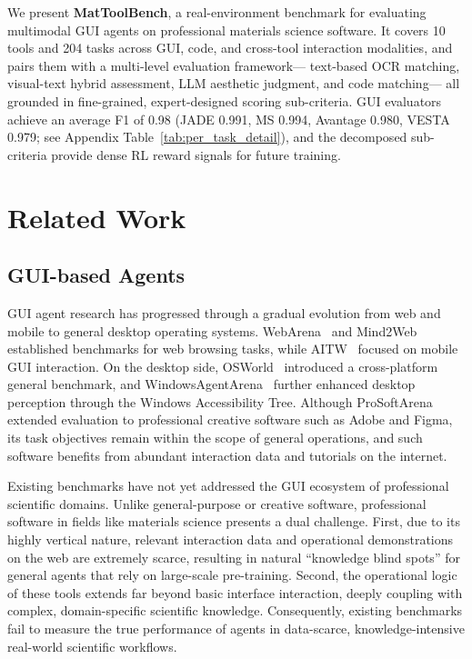 \documentclass{article}
\begin{document}
We present \textbf{MatToolBench}, a real-environment benchmark for evaluating multimodal
GUI agents on professional materials science software.
It covers 10 tools and 204 tasks across GUI, code, and cross-tool interaction modalities,
and pairs them with a multi-level evaluation framework—
text-based OCR matching, visual-text hybrid assessment, LLM aesthetic judgment, and code matching—
all grounded in fine-grained, expert-designed scoring sub-criteria.
GUI evaluators achieve an average F1 of 0.98 (JADE 0.991, MS 0.994, Avantage 0.980, VESTA 0.979;
see Appendix Table~\ref{tab:per_task_detail}), and the decomposed sub-criteria
provide dense RL reward signals for future training.
\section{Related Work}

\subsection{GUI-based Agents}
GUI agent research has progressed through a gradual evolution from web and mobile to general desktop operating systems. WebArena~\cite{webarena} and Mind2Web~\cite{mind2web} established benchmarks for web browsing tasks, while AITW~\cite{aitw} focused on mobile GUI interaction. On the desktop side, OSWorld~\cite{osworld} introduced a cross-platform general benchmark, and WindowsAgentArena~\cite{windowsagentarena} further enhanced desktop perception through the Windows Accessibility Tree. Although ProSoftArena~\cite{prosoftarena} extended evaluation to professional creative software such as Adobe and Figma, its task objectives remain within the scope of general operations, and such software benefits from abundant interaction data and tutorials on the internet. 

Existing benchmarks have not yet addressed the GUI ecosystem of professional scientific domains. Unlike general-purpose or creative software, professional software in fields like materials science presents a dual challenge. First, due to its highly vertical nature, relevant interaction data and operational demonstrations on the web are extremely scarce, resulting in natural ``knowledge blind spots'' for general agents that rely on large-scale pre-training. Second, the operational logic of these tools extends far beyond basic interface interaction, deeply coupling with complex, domain-specific scientific knowledge. Consequently, existing benchmarks fail to measure the true performance of agents in data-scarce, knowledge-intensive real-world scientific workflows.
\end{document}
